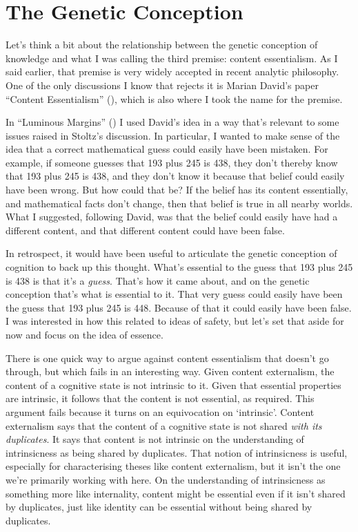 \documentclass[
  10pt,
  letterpaper,
  DIV=11,
  numbers=noendperiod,
  twoside]{scrartcl}
\begin{document}
\section{The Genetic Conception}\label{sec-genetic}

Let's think a bit about the relationship between the genetic conception
of knowledge and what I was calling the third premise: content
essentialism. As I said earlier, that premise is very widely accepted in
recent analytic philosophy. One of the only discussions I know that
rejects it is Marian David's paper ``Content Essentialism''
(), which is also where I took the
name for the premise.

In ``Luminous Margins'' () I used David's idea in a way that's relevant to some issues
raised in Stoltz's discussion. In particular, I wanted to make sense of
the idea that a correct mathematical guess could easily have been
mistaken. For example, if someone guesses that 193 plus 245 is 438, they
don't thereby know that 193 plus 245 is 438, and they don't know it
because that belief could easily have been wrong. But how could that be?
If the belief has its content essentially, and mathematical facts don't
change, then that belief is true in all nearby worlds. What I suggested,
following David, was that the belief could easily have had a different
content, and that different content could have been false.

In retrospect, it would have been useful to articulate the genetic
conception of cognition to back up this thought. What's essential to the
guess that 193 plus 245 is 438 is that it's a \emph{guess}. That's how
it came about, and on the genetic conception that's what is essential to
it. That very guess could easily have been the guess that 193 plus 245
is 448. Because of that it could easily have been false. I was
interested in how this related to ideas of safety, but let's set that
aside for now and focus on the idea of essence.

There is one quick way to argue against content essentialism that
doesn't go through, but which fails in an interesting way. Given content
externalism, the content of a cognitive state is not intrinsic to it.
Given that essential properties are intrinsic, it follows that the
content is not essential, as required. This argument fails because it
turns on an equivocation on `intrinsic'. Content externalism says that
the content of a cognitive state is not shared \emph{with its
duplicates}. It says that content is not intrinsic on the understanding
of intrinsicness as being shared by duplicates. That notion of
intrinsicness is useful, especially for characterising theses like
content externalism, but it isn't the one we're primarily working with
here. On the understanding of intrinsicness as something more like
internality, content might be essential even if it isn't shared by
duplicates, just like identity can be essential without being shared by
duplicates.
\end{document}
